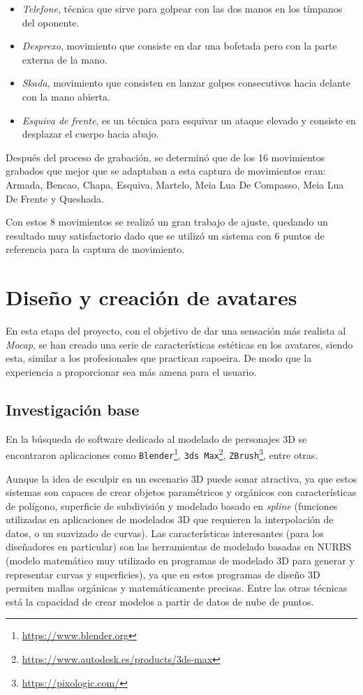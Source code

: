 \begin{itemize}
	\item \textit{Telefone}, técnica que sirve para golpear con las dos manos en los tímpanos del oponente.
	\item \textit{Desprexo}, movimiento que consiste en dar una bofetada pero con la parte externa de la mano.
	\item \textit{Skada}, movimiento que consisten en lanzar golpes consecutivos hacia delante con la mano abierta.
	\item \textit{Esquiva de frente}, es un técnica para esquivar un ataque elevado y consiste en desplazar el cuerpo hacia abajo.
\end{itemize}

Después del proceso de grabación, se determinó que de los 16 movimientos grabados que mejor que se adaptaban a esta captura de movimientos eran: Armada, Bencao, Chapa, Esquiva, Martelo, Meia Lua De Compasso, Meia Lua De Frente y Queshada.

Con estos 8 movimientos se realizó un gran trabajo de ajuste, quedando un resultado muy satisfactorio dado que se utilizó un sistema con 6 puntos de referencia para la captura de movimiento.


\section{Diseño y creación de avatares}

En esta etapa del proyecto, con el objetivo de dar una sensación más realista al \textit{Mocap}, se han creado una serie de características estéticas en los avatares, siendo esta, similar a los profesionales que practican capoeira. De modo que la experiencia a proporcionar sea más amena para el usuario.

\subsection{Investigación base} 

En la búsqueda de software dedicado al modelado de personajes 3D se encontraron aplicaciones como \texttt{Blender}\footnote{\url{https://www.blender.org}}, \texttt{3ds Max}\footnote{\url{https://www.autodesk.es/products/3ds-max}}, \texttt{ZBrush}\footnote{\url{https://pixologic.com/}}, entre otras. 

Aunque la idea de esculpir en un escenario 3D puede sonar atractiva, ya que estos sistemas son capaces de crear objetos paramétricos y orgánicos con características de polígono, superficie de subdivisión y modelado basado en \textit{spline} (funciones utilizadas en aplicaciones de modelados 3D que requieren la interpolación de datos, o un suavizado de curvas). Las características interesantes (para los diseñadores en particular) son las herramientas de modelado basadas en NURBS (modelo matemático muy utilizado en programas de modelado 3D para generar y representar curvas y superficies), ya que en estos programas de diseño 3D permiten mallas orgánicas y matemáticamente precisas. Entre las otras técnicas está la capacidad de crear modelos a partir de datos de nube de puntos.

